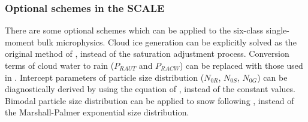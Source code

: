 \subsubsection{Optional schemes in the SCALE}
There are some optional schemes which can be applied to the six-class single-moment bulk microphysics. Cloud ice generation can be explicitly solved as the original method of \citet{lin_etal_1983}, instead of the saturation adjustment process. Conversion terms of cloud water to rain ($P_{RAUT}$ and $P_{RACW}$) can be replaced with those used in \citet{khairoutdinov_and_kogan_2000}. Intercept parameters of particle size distribution ($N_{0R}$, $N_{0S}$, $N_{0G}$) can be diagnostically derived by using the equation of \citet{wainwright_etal_2014}, instead of the constant values. Bimodal particle size distribution can be applied to snow following \citet{roh_and_satoh_2007}, instead of the Marshall-Palmer exponential size distribution.

